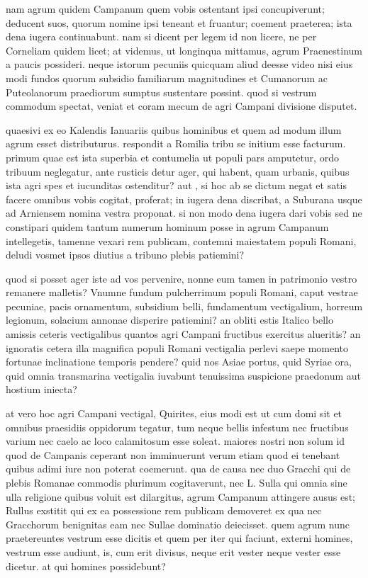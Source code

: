  nam agrum quidem Campanum quem vobis ostentant ipsi concupiverunt; deducent suos, quorum nomine ipsi teneant et fruantur; coement praeterea; ista dena iugera continuabunt. nam si dicent per legem id non licere, ne per Corneliam quidem licet; at videmus, ut longinqua mittamus, agrum Praenestinum a paucis possideri. neque istorum pecuniis quicquam aliud deesse video nisi eius modi fundos quorum subsidio familiarum magnitudines et Cumanorum ac Puteolanorum praediorum sumptus sustentare possint. quod si vestrum commodum spectat, veniat et coram mecum de agri Campani divisione disputet.

 quaesivi ex eo Kalendis Ianuariis quibus hominibus et quem ad modum illum agrum esset distributurus. respondit a Romilia tribu se initium esse facturum. primum quae est ista superbia et contumelia ut populi pars amputetur, ordo tribuum neglegatur, ante rusticis detur ager, qui habent, quam urbanis, quibus ista agri spes et iucunditas ostenditur? aut , si hoc ab se dictum negat et satis facere omnibus vobis cogitat, proferat; in iugera dena discribat, a Suburana usque ad Arniensem nomina vestra proponat. si non modo dena iugera dari vobis sed ne constipari quidem tantum numerum hominum posse in agrum Campanum intellegetis, tamenne vexari rem publicam, contemni maiestatem populi Romani, deludi vosmet ipsos diutius a tribuno plebis patiemini?

 quod si posset ager iste ad vos pervenire, nonne eum tamen in patrimonio vestro remanere malletis? Vnumne fundum pulcherrimum populi Romani, caput vestrae pecuniae, pacis ornamentum, subsidium belli, fundamentum vectigalium, horreum legionum, solacium annonae disperire patiemini? an obliti estis Italico bello amissis ceteris vectigalibus quantos agri Campani fructibus exercitus alueritis? an ignoratis cetera illa magnifica populi Romani vectigalia perlevi saepe momento fortunae inclinatione temporis pendere? quid nos Asiae portus, quid Syriae ora, quid omnia transmarina vectigalia iuvabunt tenuissima suspicione praedonum aut hostium iniecta?

 at vero hoc agri Campani vectigal, Quirites, eius modi est ut cum domi sit et omnibus praesidiis oppidorum tegatur, tum neque bellis infestum nec fructibus varium nec caelo ac loco calamitosum esse soleat. maiores nostri non solum id quod de Campanis ceperant non imminuerunt verum etiam quod ei tenebant quibus adimi iure non poterat coemerunt. qua de causa nec duo Gracchi qui de plebis Romanae commodis plurimum cogitaverunt, nec L. Sulla qui omnia sine ulla religione quibus voluit est dilargitus, agrum Campanum attingere ausus est; Rullus exstitit qui ex ea possessione rem publicam demoveret ex qua nec Gracchorum benignitas eam nec Sullae dominatio deiecisset. quem agrum nunc praetereuntes vestrum esse dicitis et quem per iter qui faciunt, externi homines, vestrum esse audiunt, is, cum erit divisus, neque erit vester neque vester esse dicetur. at qui homines possidebunt?

